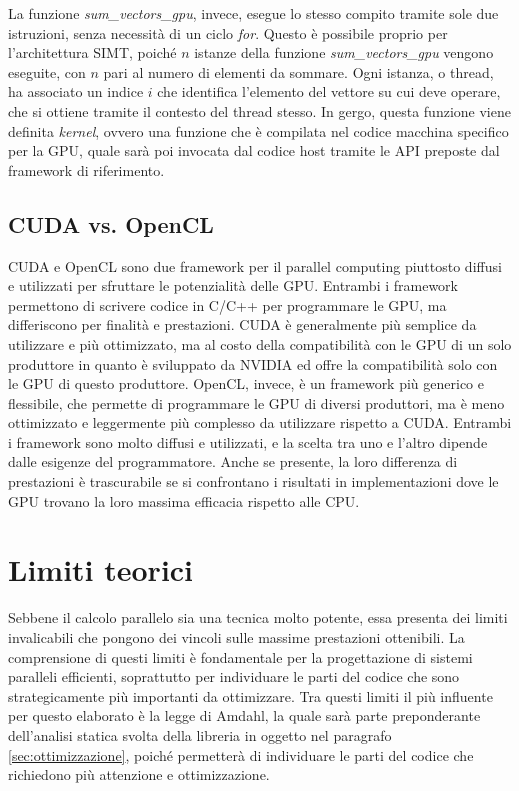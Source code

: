 La funzione \textit{sum\_vectors\_gpu}, invece, esegue lo stesso compito tramite
sole due istruzioni, senza necessità di un ciclo \textit{for}. Questo è
possibile proprio per l'architettura SIMT, poiché $n$ istanze della funzione \textit{sum\_vectors\_gpu}
vengono eseguite, con $n$ pari al numero di elementi da sommare. Ogni istanza, o
thread, ha associato un indice $i$ che identifica l'elemento del vettore su cui
deve operare, che si ottiene tramite il contesto del thread stesso. In gergo, questa
funzione viene definita \textit{kernel}, ovvero una funzione che è compilata nel
codice macchina specifico per la GPU, quale sarà poi invocata dal codice host
tramite le API preposte dal framework di riferimento.

\subsection{CUDA vs. OpenCL}
\label{subsec:cudavsopencl}

CUDA e OpenCL sono due framework per il parallel computing piuttosto diffusi e utilizzati
per sfruttare le potenzialità delle GPU. Entrambi i framework permettono di
scrivere codice in C/C++ per programmare le GPU, ma differiscono per finalità e prestazioni.
CUDA è generalmente più semplice da utilizzare e più ottimizzato, ma al costo della
compatibilità con le GPU di un solo produttore in quanto è sviluppato da NVIDIA ed
offre la compatibilità solo con le GPU di questo produttore. OpenCL, invece, è
un framework più generico e flessibile, che permette di programmare le GPU di diversi
produttori, ma è meno ottimizzato e leggermente più complesso da utilizzare
rispetto a CUDA. Entrambi i framework sono molto diffusi e utilizzati, e la
scelta tra uno e l'altro dipende dalle esigenze del programmatore. Anche se presente,
la loro differenza di prestazioni è trascurabile se si confrontano i risultati
in implementazioni dove le GPU trovano la loro massima efficacia rispetto alle
CPU.

\section{Limiti teorici}
\label{sec:limititeorici}

Sebbene il calcolo parallelo sia una tecnica molto potente, essa presenta dei
limiti invalicabili che pongono dei vincoli sulle massime prestazioni ottenibili.
La comprensione di questi limiti è fondamentale per la progettazione di sistemi paralleli
efficienti, soprattutto per individuare le parti del codice che sono
strategicamente più importanti da ottimizzare. Tra questi limiti il più influente
per questo elaborato è la legge di Amdahl, la quale sarà parte preponderante
dell'analisi statica svolta della libreria in oggetto nel paragrafo
\ref{sec:ottimizzazione}, poiché permetterà di individuare le parti del codice che
richiedono più attenzione e ottimizzazione.

